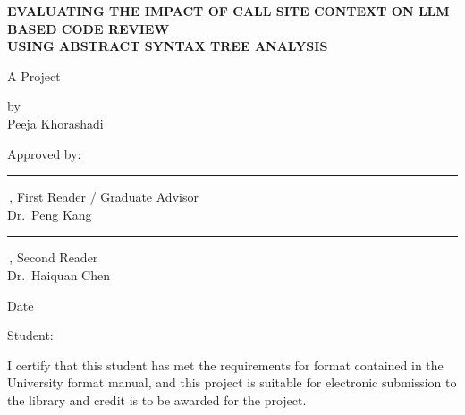 \documentclass[12pt]{report}
\begin{document}
\thispagestyle{fancy}
\begin{center}
{\large\bfseries
EVALUATING THE IMPACT OF CALL SITE CONTEXT ON LLM BASED CODE REVIEW \\[12pt]
USING ABSTRACT SYNTAX TREE ANALYSIS
}

\vspace{0.5in}

A Project

\vspace{0.4in}

by \\[6pt]
Peeja Khorashadi
\end{center}

\vspace{0.6in}

\noindent Approved by:

\vspace{0.6in}

\noindent\rule{3.5in}{0.4pt}\,, First Reader / Graduate Advisor \\[4pt]
\noindent Dr.\ Peng Kang

\vspace{0.6in}

\noindent\rule{3.5in}{0.4pt}\,, Second Reader \\[4pt]
\noindent Dr.\ Haiquan Chen

\vspace{0.6in}

\noindent Date
\clearpage

\thispagestyle{fancy}
\vspace*{1in}

\noindent Student: \underline{%
}

\vspace{0.6in}

\noindent I certify that this student has met the requirements for format contained in the University format manual, and this project is suitable for electronic submission to the library and credit is to be awarded for the project.

\vspace{0.9in}
\end{document}

